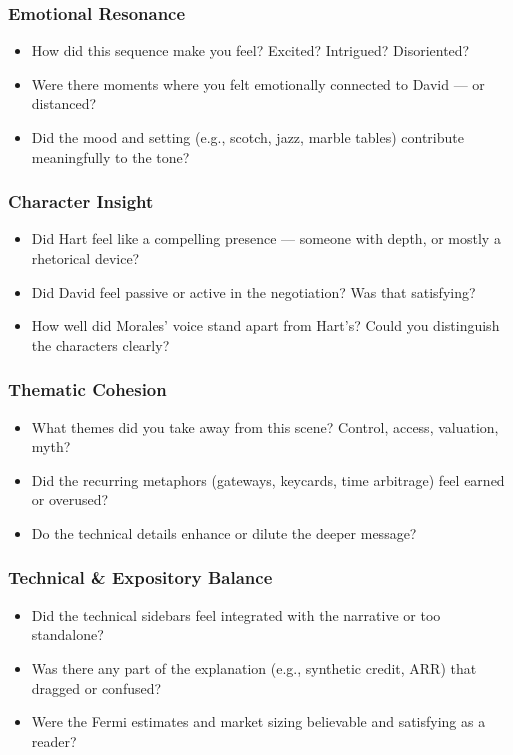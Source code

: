 \subsubsection{Emotional Resonance}

\begin{itemize}
\item How did this sequence make you feel? Excited? Intrigued? Disoriented?
\item Were there moments where you felt emotionally connected to David — or distanced?
\item Did the mood and setting (e.g., scotch, jazz, marble tables) contribute meaningfully to the tone?
\end{itemize}

\subsubsection{Character Insight}

\begin{itemize}
\item Did Hart feel like a compelling presence — someone with depth, or mostly a rhetorical device?
\item Did David feel passive or active in the negotiation? Was that satisfying?
\item How well did Morales' voice stand apart from Hart’s? Could you distinguish the characters clearly?
\end{itemize}

\subsubsection{Thematic Cohesion}

\begin{itemize}
\item What themes did you take away from this scene? Control, access, valuation, myth?
\item Did the recurring metaphors (gateways, keycards, time arbitrage) feel earned or overused?
\item Do the technical details enhance or dilute the deeper message?
\end{itemize}

\subsubsection{Technical \& Expository Balance}

\begin{itemize}
\item Did the technical sidebars feel integrated with the narrative or too standalone?
\item Was there any part of the explanation (e.g., synthetic credit, ARR) that dragged or confused?
\item Were the Fermi estimates and market sizing believable and satisfying as a reader?
\end{itemize}

